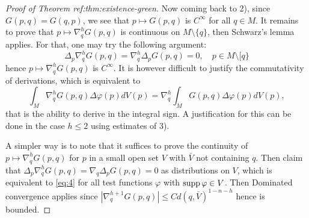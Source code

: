 \begin{proof}[Proof of Theorem ref:thm:existence-green]
Now coming back to 2), since \(G(p,q) = G(q,p)\), we see that \(p\mapsto G(p,q)\) is
\(C^\infty\) for all \(q\in M\). It remains to prove that \(p\mapsto \nabla_q^h
G(p,q)\) is continuous on \(M\setminus \{q\}\), then Schwarz's lemma applies. For that,
one may try the following argument:
\[
 \Delta_p \nabla_q^hG(p,q) = \nabla_q^h\Delta_pG(p,q) = 0,\quad p\in M\setminus[q\}
\]
hence \(p\mapsto \nabla_q^h G(p,q)\) is \(C^\infty\). It is however difficult to
justify the commutativity of derivations, which is equivalent to
\begin{equation}
\label{eq:4}
\int_M \nabla_q^h G(p,q)\Delta \varphi(p) dV(p) = \nabla_q^h\int_M G(p,q) \Delta\varphi(p) dV(p),
\end{equation}
that is the ability to derive in the integral sign. A justification for this can be done
in the case \(h\leq 2\) using estimates of 3). 

A simpler way is to note that it suffices to prove the continuity of \(p\mapsto
\nabla_q^hG(p,q)\)  for \(p\) in a small open set \(V\) with \(\bar V\) not containing \(q\). Then
claim that \(\Delta_p \nabla_q^h G(p,q) = \nabla_q\Delta_p G(p,q)=0\) as distributions
on \(V\), which is equivalent to \eqref{eq:4} for all test functions \(\varphi\) with \(\mathop{\rm supp}\nolimits\varphi\in V\). Then Dominated convergence applies since
\(|\nabla_q^{h+1}G(p,q)|\leq Cd(q,\bar V)^{1-n-h}\) hence is bounded.
\end{proof}
